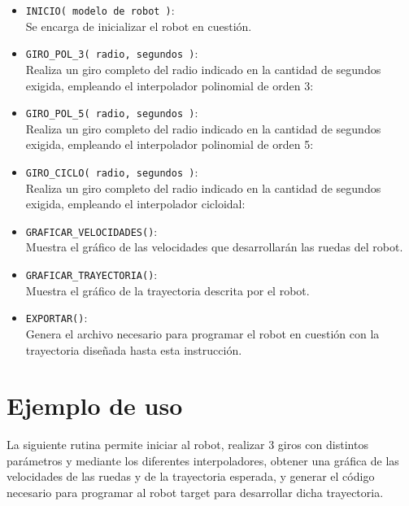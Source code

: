 \documentclass[12pt,a4paper]{article}
\begin{document}
    \begin{itemize}
		\item[]	\verb|INICIO( modelo de robot )|:\\
        		Se encarga de inicializar el robot en cuestión.
        
        \item[]	\verb|GIRO_POL_3( radio, segundos )|:\\
        		Realiza un giro completo del radio indicado en la cantidad de segundos exigida, empleando el interpolador polinomial de orden 3:
                
        \item[]	\verb|GIRO_POL_5( radio, segundos )|:\\
        		Realiza un giro completo del radio indicado en la cantidad de segundos exigida, empleando el interpolador polinomial de orden 5:
                
        \item[]	\verb|GIRO_CICLO( radio, segundos )|:\\
        		Realiza un giro completo del radio indicado en la cantidad de segundos exigida, empleando el interpolador cicloidal:
                
		\item[]	\verb|GRAFICAR_VELOCIDADES()|:\\
        		Muestra el gráfico de las velocidades que desarrollarán las ruedas del robot.
                
		\item[]	\verb|GRAFICAR_TRAYECTORIA()|:\\
        		Muestra el gráfico de la trayectoria descrita por el robot.
                
		\item[]	\verb|EXPORTAR()|:\\
        		Genera el archivo necesario para programar el robot en cuestión con la trayectoria diseñada hasta esta instrucción.
        
	\end{itemize}
    
    
    \section{Ejemplo de uso}
    
    La siguiente rutina permite iniciar al robot, realizar 3 giros con distintos parámetros y mediante los diferentes interpoladores, obtener una gráfica de las velocidades de las ruedas y de la trayectoria esperada, y generar el código necesario para programar al robot target para desarrollar dicha trayectoria.
    
\end{document}

